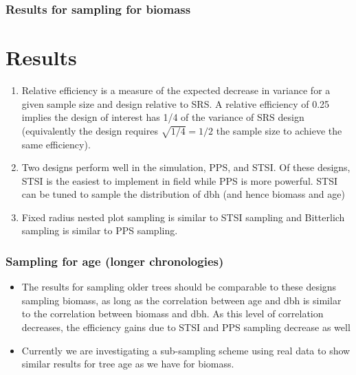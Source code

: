 \documentclass{beamer}
\begin{document}
\begin{frame}
  \frametitle{Results for sampling for biomass}
  \section{Results}
  \begin{enumerate}
    \item Relative efficiency is a measure of the expected decrease in variance for a given sample size and design relative to SRS. A relative efficiency of 0.25 implies the design of interest has 1/4 of the variance of SRS design (equivalently the design requires $\sqrt{1/4} = 1/2$ the sample size to achieve the same efficiency).
    \item Two designs perform well in the simulation, PPS, and STSI. Of these designs, STSI is the easiest to implement in field while PPS is more powerful. STSI can be tuned to sample the distribution of dbh (and hence biomass and age)
    \item Fixed radius nested plot sampling is similar to STSI sampling and Bitterlich sampling is similar to PPS sampling.
  \end{enumerate}
\end{frame}
%
\begin{frame}
  \frametitle{Sampling for age (longer chronologies)}
  \begin{itemize}
    \item The results for sampling older trees should be comparable to these designs sampling biomass, as long as the correlation between age and dbh is similar to the correlation between biomass and dbh. As this level of correlation decreases, the efficiency gains due to STSI and PPS sampling decrease as well
    \item Currently we are investigating a sub-sampling scheme using real data to show similar results for tree age as we have for biomass.
  \end{itemize}
\end{frame}
%
\end{document}
